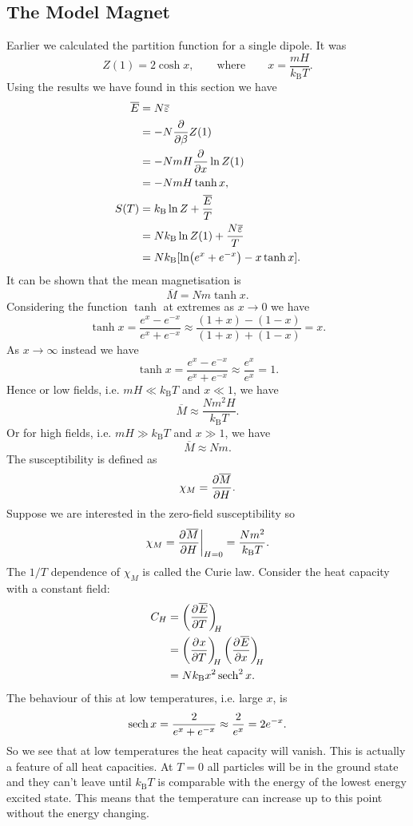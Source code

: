 \documentclass[a4paper]{article}
\newcommand{\boltzmann}{k_\mathrm{B}}
\newcommand{\mean}[1]{\overline{#1}}
\begin{document}
    \subsection{The Model Magnet}
    Earlier we calculated the partition function for a single dipole.
    It was
    \[Z(1) = 2\cosh x, \qquad\text{where}\qquad x = \frac{mH}{\boltzmann T}.\]
    Using the results we have found in this section we have
    \begin{align*}
        \mean{E} &= N\mean{\varepsilon}\\
        &= -N\pdv{\beta} Z(1)\\
        &= - NmH\pdv{x}\ln Z(1)\\
        &= -NmH\tanh x,\\
        S(T) &= \boltzmann\ln Z + \frac{\mean{E}}{T}\\
        &= N\boltzmann \ln Z(1) + \frac{N\mean{\varepsilon}}{T}\\
        &= N\boltzmann [\ln(e^x + e^{-x}) - x\tanh x].
    \end{align*}
    It can be shown that the mean magnetisation is
    \[\mean{M} = Nm\tanh x.\]
    Considering the function \(\tanh\) at extremes as \(x\to 0\) we have
    \[\tanh x = \frac{e^{x} - e^{-x}}{e^{x} + e^{-x}} \approx \frac{(1 + x) - (1 - x)}{(1 + x) + (1 - x)} = x.\]
    As \(x\to\infty\) instead we have
    \[\tanh x = \frac{e^{x} - e^{-x}}{e^{x} + e^{-x}} \approx \frac{e^x}{e^x} = 1.\]
    Hence or low fields, i.e. \(mH \ll \boltzmann T\) and \(x \ll 1\), we have
    \[\mean{M} \approx \frac{Nm^2H}{\boltzmann T}.\]
    Or for high fields, i.e. \(mH \gg \boltzmann T\) and \(x \gg 1\), we have
    \[\mean{M} \approx Nm.\]
    The susceptibility is defined as
    \[\chi_M = \pdv{\mean{M}}{H}.\]
    Suppose we are interested in the zero-field susceptibility so
    \[\chi_M = \pdvat{\mean{M}}{H}{H=0} = \frac{Nm^2}{\boltzmann T}.\]
    The \(1/T\) dependence of \(\chi_M\)  is called the Curie law.
    Consider the heat capacity with a constant field:
    \begin{align*}
        C_H &= \pdvconst{\mean{E}}{T}{H}\\
        &= \pdvconst{x}{T}{H}\pdvconst{\mean{E}}{x}{H}\\
        &= N\boltzmann x^2\sech^2x.
    \end{align*}
    The behaviour of this at low temperatures, i.e. large \(x\), is
    \[\sech x = \frac{2}{e^x + e^{-x}} \approx \frac{2}{e^x} = 2e^{-x}.\]
    So we see that at low temperatures the heat capacity will vanish.
    This is actually a feature of all heat capacities.
    At \(T = 0\) all particles will be in the ground state and they can't leave until \(\boltzmann T\) is comparable with the energy of the lowest energy excited state.
    This means that the temperature can increase up to this point without the energy changing.
    
\end{document}
